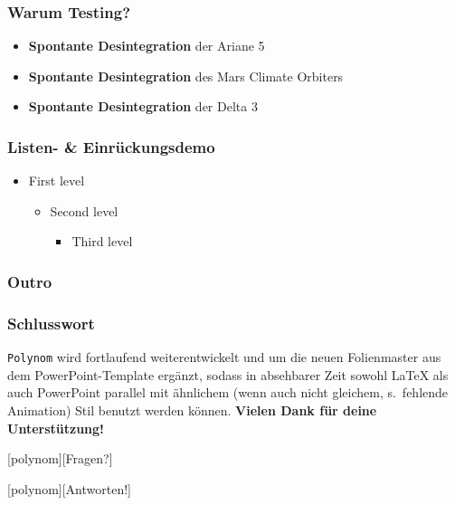 \documentclass[t]{beamer}
\begin{document}
\begin{frame}
  \frametitle{Warum Testing?}
  \begin{itemize}
    \item \textbf{Spontante Desintegration} der Ariane 5
    \item \textbf{Spontante Desintegration} des Mars Climate Orbiters
    \item \textbf{Spontante Desintegration} der Delta 3
  \end{itemize}
\end{frame}

\begin{frame}
  \frametitle{Listen- \& Einrückungsdemo}
  \begin{itemize}
    \item First level
    \begin{itemize}
      \item Second level
      \begin{itemize}
        \item Third level
      \end{itemize}
    \end{itemize}
  \end{itemize}
\end{frame}

\subsubsection{Outro}

\setPaletteGreen
\begin{frame}
  \frametitle{Schlusswort}
  \texttt{Polynom} wird fortlaufend weiterentwickelt und um die neuen Folienmaster aus dem PowerPoint-Template ergänzt, sodass 
  in absehbarer Zeit sowohl \LaTeX{} als auch PowerPoint parallel mit ähnlichem (wenn auch nicht gleichem, s.\ fehlende Animation) Stil
  benutzt werden können.
  \vspace{42pt}
  \textbf{Vielen Dank für deine Unterstützung!}
\end{frame}

[polynom][Fragen?]
\begin{frame}
\end{frame}

[polynom][Antworten!]
\begin{frame}
\end{frame}
\end{document}
